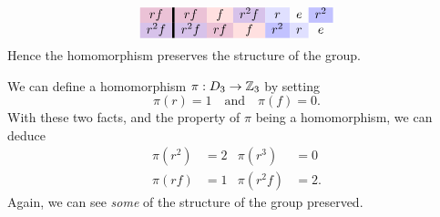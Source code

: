 \documentclass{ximera}
\begin{document}
\begin{example}
\[\begin{array}{c!{\vline width 2pt}cccccc}
      r f \cellcolor{blue!33!red!24!white}        & rf \cellcolor{blue!33!red!24!white}   & f \cellcolor{red!12!white} & r^2f \cellcolor{blue!66!red!24!white}    & r\cellcolor{blue!12!white}   & e     & r^2\cellcolor{blue!24!white}    \\  
      r^2 f\cellcolor{blue!66!red!24!white}      & r^2 f\cellcolor{blue!66!red!24!white} & rf \cellcolor{blue!33!red!24!white}    & f \cellcolor{red!12!white}   & r^2\cellcolor{blue!24!white}    & r\cellcolor{blue!12!white}   & e     \\  
    \end{array}
    \]
    Hence the homomorphism preserves the structure of the group.
\end{example}


\begin{example}\label{EG:D3-Z3}
  We can define a homomorphism $\pi:D_3\to \mathbb Z_3$ by setting
  \[
  \pi(r) = 1\quad\text{and}\quad\pi(f) = 0. 
  \]
  With these two facts, and the property of $\pi$ being a
  homomorphism, we can deduce
  \begin{align*}
    \pi(r^2) &= 2 &  \pi(r^3) &= 0 \\
    \pi(rf)  &=1 & \pi(r^2f) &= 2.
  \end{align*}
 Again, we can see \textit{some} of the structure of the group preserved.
\end{example}
\end{document}
